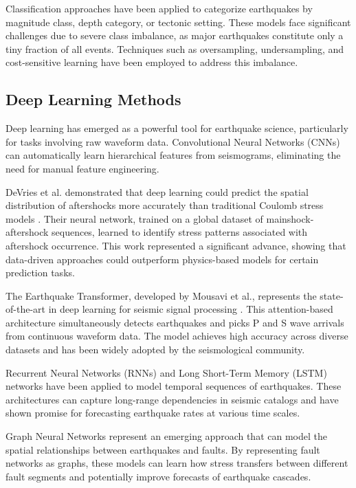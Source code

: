 Classification approaches have been applied to categorize earthquakes by magnitude class, depth category, or tectonic setting. These models face significant challenges due to severe class imbalance, as major earthquakes constitute only a tiny fraction of all events. Techniques such as oversampling, undersampling, and cost-sensitive learning have been employed to address this imbalance.

\subsection{Deep Learning Methods}

Deep learning has emerged as a powerful tool for earthquake science, particularly for tasks involving raw waveform data. Convolutional Neural Networks (CNNs) can automatically learn hierarchical features from seismograms, eliminating the need for manual feature engineering.

DeVries et al. demonstrated that deep learning could predict the spatial distribution of aftershocks more accurately than traditional Coulomb stress models \cite{devries2018}. Their neural network, trained on a global dataset of mainshock-aftershock sequences, learned to identify stress patterns associated with aftershock occurrence. This work represented a significant advance, showing that data-driven approaches could outperform physics-based models for certain prediction tasks.

The Earthquake Transformer, developed by Mousavi et al., represents the state-of-the-art in deep learning for seismic signal processing \cite{mousavi2020}. This attention-based architecture simultaneously detects earthquakes and picks P and S wave arrivals from continuous waveform data. The model achieves high accuracy across diverse datasets and has been widely adopted by the seismological community.

Recurrent Neural Networks (RNNs) and Long Short-Term Memory (LSTM) networks have been applied to model temporal sequences of earthquakes. These architectures can capture long-range dependencies in seismic catalogs and have shown promise for forecasting earthquake rates at various time scales.

Graph Neural Networks represent an emerging approach that can model the spatial relationships between earthquakes and faults. By representing fault networks as graphs, these models can learn how stress transfers between different fault segments and potentially improve forecasts of earthquake cascades.

